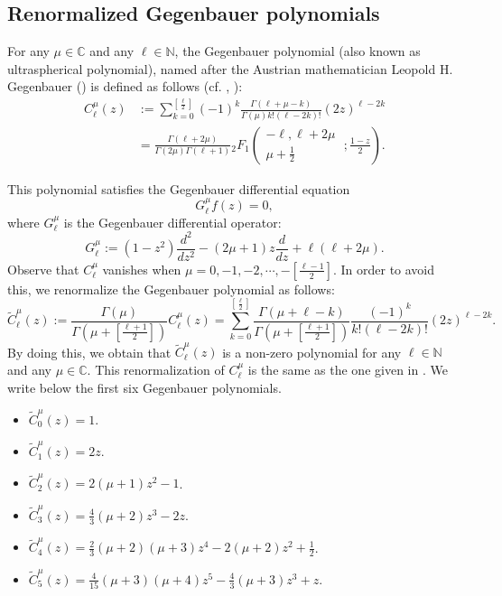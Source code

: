 \documentclass[12pt, pdflatex, a4paper]{article}
\theoremstyle{plain}
\theoremstyle{definition}
\def\C{{\mathbb C}}
\def\Geg{\widetilde{C}}
\def\N{{\mathbb N}}
\begin{document}
\subsection{Renormalized Gegenbauer polynomials}
For any $\mu \in \C$ and any $\ell \in \N$, the Gegenbauer polynomial (also known as ultraspherical polynomial), named after the Austrian mathematician Leopold H. Gegenbauer (\cite{Geg74}) is defined as follows (cf. \cite[Sec. 6.4]{AAR99}, \cite[Sec. 3.15.1]{EMOT53}):
\begin{equation*}
\begin{aligned}
C_\ell^\mu(z) & := \sum_{k = 0}^{[\frac{\ell}{2}]}(-1)^k \frac{\Gamma(\ell + \mu - k)}{\Gamma(\mu)k!(\ell -  2k)!}(2z)^{\ell - 2k}\\
& = \frac{\Gamma(\ell + 2\mu)}{\Gamma(2\mu)\Gamma(\ell + 1)}{}_2F_1\left(
\begin{matrix}
-\ell, \ell +2\mu \\
\mu+ \frac{1}{2}
\end{matrix}
\; ; \frac{1-z}{2} \right).
\end{aligned}
\end{equation*}

This polynomial satisfies the Gegenbauer differential equation
\begin{equation*}
G_\ell^\mu f(z) = 0,
\end{equation*}
where $G_\ell^\mu$ is the Gegenbauer differential operator:
\begin{equation*}
G_\ell^\mu := (1-z^2)\frac{d^2}{dz^2} - (2\mu +1)z\frac{d}{dz} + \ell(\ell +2\mu).
\end{equation*}
Observe that $C_\ell^\mu$ vanishes when $\mu = 0, -1, -2, \cdots, - [\frac{\ell-1}{2}]$. In order to avoid this, we renormalize the Gegenbauer polynomial as follows:
\begin{equation}\label{Gegenbauer-polynomial(renormalized)}
\widetilde{C}^\mu_\ell(z) := \frac{\Gamma(\mu)}{\Gamma\left(\mu + [\frac{\ell + 1}{2}]\right)}C^\mu_\ell(z) =\sum_{k=0}^{[\frac{\ell}{2}]}\frac{\Gamma(\mu + \ell - k)}{\Gamma\left(\mu+ [\frac{\ell + 1}{2}]\right)}\frac{(-1)^k }{k! (\ell - 2k)!}(2z)^{\ell - 2k}.
\end{equation}
By doing this, we obtain that $\Geg_\ell^\mu(z)$ is a non-zero polynomial for any $\ell \in \N$ and any $\mu \in \C$. This renormalization of $C_\ell^\mu$ is the same as the one given in \cite{KKP16, KP16b, Per-Val23, Per-Val24}. We write below the first six Gegenbauer polynomials.

\begin{itemize}
\item $\widetilde{C}^\mu_0(z) = 1$.
\item $\widetilde{C}^\mu_1(z) = 2z$.
\item $\widetilde{C}^\mu_2(z) = 2(\mu + 1) z^2 -1$.
\item $\widetilde{C}^\mu_3(z) = \frac{4}{3}(\mu + 2) z^3 -2z$.
\item $\widetilde{C}^\mu_4(z) = \frac{2}{3}(\mu +2)(\mu+3)z^4 -
2(\mu + 2)z^2 + \frac{1}{2}$.
\item $\widetilde{C}^\mu_5(z) = \frac{4}{15}(\mu+3)(\mu+4)z^5 - \frac{4}{3}(\mu+3)z^3 + z$.
\end{itemize}
\end{document}
